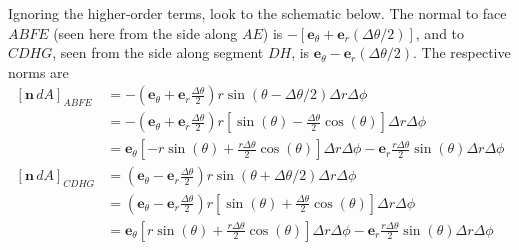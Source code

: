 \documentclass[a4paper]{article}
\begin{document}
Ignoring the higher-order terms, look to the schematic below. The normal to face \( ABFE \) (seen here from the side along \( AE \)) is \( -\!\left[ \pmb{e}_{\theta} + \pmb{e}_{r}\!\left( \Delta \theta / 2 \right) \right] \), and to \( CDHG \), seen from the side along segment \( DH \), is \( \pmb{e}_{\theta} - \pmb{e}_{r}\!\left( \Delta \theta / 2 \right) \). The respective norms are 
\begin{align*}
	\!\left[ \pmb{n} \, dA \right]_{ABFE} & = -\!\left( \pmb{e}_{\theta} + \pmb{e}_{r}\frac{\Delta \theta}{2} \right)r \sin\!\left(\theta - \Delta \theta / 2\right) \Delta r \Delta \phi \\
				   & = -\!\left( \pmb{e}_{\theta} + \pmb{e}_{r}\frac{\Delta \theta}{2} \right)r \!\left[ \sin\!\left(\theta\right) - \frac{\Delta \theta}{2}\cos\!\left(\theta\right) \right] \Delta r \Delta \phi \\
				   & = \boxed{\pmb{e}_{\theta}\!\left[ -r \sin\!\left(\theta\right) + \frac{r \Delta \theta}{2}\cos\!\left(\theta\right) \right]\Delta r \Delta \phi - \pmb{e}_{r}\frac{r \Delta \theta}{2}\sin\!\left(\theta\right)\Delta r \Delta \phi} \\
	\!\left[ \pmb{n} \, dA \right]_{CDHG} & = \!\left( \pmb{e}_{\theta} - \pmb{e}_{r}\frac{\Delta \theta}{2} \right)r \sin\!\left(\theta + \Delta \theta / 2\right)\Delta r \Delta \phi \\
					      & = \!\left( \pmb{e}_{\theta} - \pmb{e}_{r}\frac{\Delta \theta}{2} \right)r \!\left[ \sin\!\left(\theta\right) + \frac{\Delta \theta}{2}\cos\!\left(\theta\right) \right]\Delta r \Delta \phi \\
					      & = \boxed{\pmb{e}_{\theta}\!\left[ r \sin\!\left(\theta\right) + \frac{r \Delta \theta}{2}\cos\!\left(\theta\right) \right]\Delta r \Delta \phi - \pmb{e}_{r}\frac{r \Delta \theta}{2}\sin\!\left(\theta\right)\Delta r \Delta \phi}
\end{align*}
\end{document}
